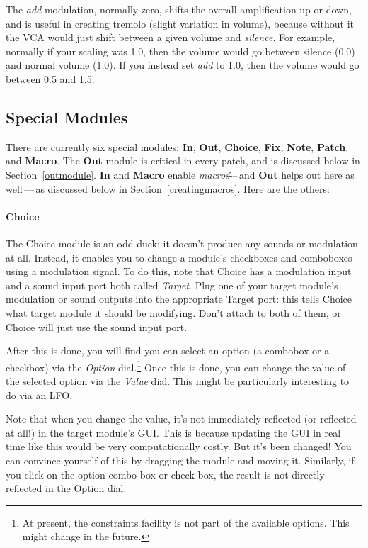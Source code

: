\documentclass{article}
\begin{document}
The {\it add} modulation, normally zero, shifts the overall amplification up or down, and is useful in creating tremolo (slight variation in volume), because without it the VCA would just shift between a given volume and {\it silence}. For example, normally if your scaling was 1.0, then the volume would go between silence (0.0) and normal volume (1.0).  If you instead set {\it add} to 1.0, then the volume would go between 0.5 and 1.5.

\subsection{Special Modules}
\label{specialmodules}

There are currently six special modules: {\bf In}, {\bf Out}, {\bf Choice}, {\bf Fix}, {\bf Note}, {\bf Patch}, and {\bf Macro}.  The {\bf Out} module is critical in every patch, and is discussed below in Section~\ref{outmodule}.  {\bf In} and {\bf Macro} enable {\it macros}\.---\,and {\bf Out} helps out here as well\,---\,as discussed below in Section~\ref{creatingmacros}.  Here are the others:

\paragraph{Choice}  The Choice module is an odd duck: it doesn't produce any sounds or modulation at all.  Instead, it enables you to change a module's checkboxes and comboboxes using a modulation signal.  To do this, note that Choice has a modulation input and a sound input port both called {\it Target}.   Plug one of your target module's modulation or sound outputs into the appropriate Target port: this tells Choice what target module it should be modifying.  Don't attach to both of them, or Choice will just use the sound input port.

After this is done, you will find you can select an option (a combobox or a checkbox) via the {\it Option} dial.\footnote{At present, the constraints facility is not part of the available options.  This might change in the future.} Once this is done, you can change the value of the selected option via the {\it Value} dial.  This might be particularly interesting to do via an LFO.

Note that when you change the value, it's not immediately reflected (or reflected at all!) in the target module's GUI.  This is because updating the GUI in real time like this would be very computationally costly.  But it's been changed!  You can convince yourself of this by dragging the module and moving it.  Similarly, if you click on the option combo box or check box, the result is not directly reflected in the Option dial.
\end{document}

